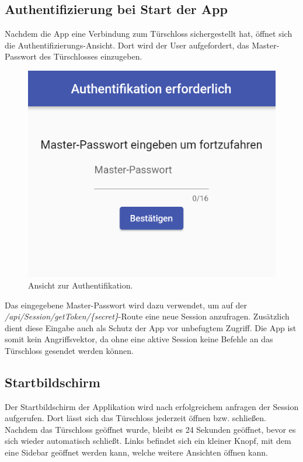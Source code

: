 \subsection{Authentifizierung bei Start der App}
Nachdem die App eine Verbindung zum Türschloss sichergestellt hat, öffnet sich die Authentifizierungs-Ansicht.
Dort wird der User aufgefordert, das Master-Passwort des Türschlosses einzugeben.

\begin{figure}[H]
    \begin{center}
        \includegraphics[width=.5\textwidth]{images/mobile/AuthScreen.png}
        \caption{Ansicht zur Authentifikation.}
    \end{center}
\end{figure}

Das eingegebene Master-Passwort wird dazu verwendet, um auf der \textit{/api/Session/getToken/\{secret\}}-Route
eine neue Session anzufragen. Zusätzlich dient diese Eingabe auch als Schutz der App vor unbefugtem Zugriff.
Die App ist somit kein Angriffsvektor, da ohne eine aktive Session keine Befehle an das Türschloss gesendet werden können.
\pagebreak
\subsection{Startbildschirm}
Der Startbildschirm der Applikation wird nach erfolgreichem anfragen der Session aufgerufen.
Dort lässt sich das Türschloss jederzeit öffnen bzw. schließen.
Nachdem das Türschloss geöffnet wurde, bleibt es 24 Sekunden geöffnet, bevor es sich wieder automatisch schließt.
Links befindet sich ein kleiner Knopf, mit dem eine Sidebar geöffnet werden kann, welche weitere Ansichten öffnen kann.

